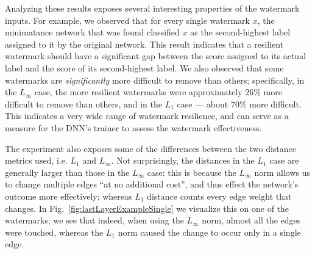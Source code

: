 \documentclass{easychair}
\newcommand{\guy}[1]{\marginpar{\textcolor{orange}{Guy: #1}}}
\begin{document}
Analyzing these results exposes several interesting properties of the
watermark inputs. For example, we observed 
that for every single watermark $x$, the minimatance network that
was found classified $x$ as the second-highest label assigned to
it by the original network. This result indicates
that a resilient watermark should have a
significant gap between the score assigned to its actual label and
the score of its second-highest label. We also observed that some
watermarks are \emph{significantly} more difficult to remove than
others; specifically, in the $L_\infty$ case, the more resilient
watermarks were approximately $26\%$ more difficult to remove than
others, and in the $L_1$ case --- about $70\%$ more
difficult. \guy{TODO: ben, please check these numbers with the raw
  data. Also, can you check if the hardest benchmarks had larger gaps
  between the winner and runner-up label?}
This indicates a very wide range of watermark resilience, and can
serve as a measure for the DNN's trainer to assess the watermark effectiveness.

The experiment also exposes some of the differences between the two
distance metrics used, i.e. $L_1$ and $L_\infty$. Not surprisingly,
the distances in the $L_1$ case are generally larger than those in the
$L_\infty$ case: this is because the $L_\infty$ norm allows us to
change multiple edges ``at no additional cost'', and thus effect the
network's outcome more effectively; whereas $L_1$ distance counts
every edge weight that changes. In
Fig.~\ref{fig:lastLayerExampleSingle} we visualize this on one
of the watermarks; we see that indeed, when using the $L_\infty$ norm,
almost all the edges were touched, whereas the $L_1$ norm caused the
change to occur only in a single edge.
\end{document}
